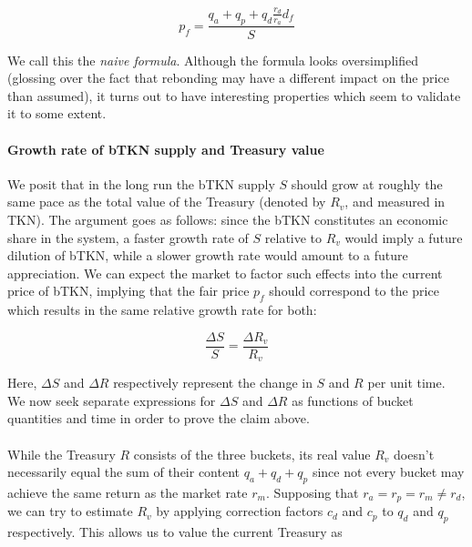\documentclass{article}
\begin{document}
\begin{equation}
  \label{eq:naive-4}
   p_f = \frac{q_a + q_p + q_d \frac{r_d}{r_a} d_f}{S}
\end{equation}

We call this the \textit{naive formula}. Although the formula looks oversimplified (glossing over the fact that rebonding may have a different impact on the price than assumed), it turns out to have interesting properties which seem to validate it to some extent.

\paragraph{Growth rate of bTKN supply and Treasury value}
We posit that in the long run the bTKN supply $S$ should grow at roughly the same pace as the total value of the Treasury (denoted by $R_v$, and measured in TKN). The argument goes as follows: since the bTKN constitutes an economic share in the system, a faster growth rate of $S$ relative to $R_v$ would imply a future dilution of bTKN, while a slower growth rate would amount to a future appreciation. We can expect the market to factor such effects into the current price of bTKN, implying that the fair price $p_f$ should correspond to the price which results in the same relative growth rate for both:

\begin{equation}
  \label{eq:same_growth_rate}
  \frac{\Delta S}{S} = \frac{\Delta R_v}{R_v}
\end{equation}


Here, $\Delta S$ and $\Delta R$ respectively represent the change in $S$ and $R$ per unit time.  We now seek separate expressions for $\Delta S$ and $\Delta R$ as functions of bucket quantities and time in order to prove the claim above.

\paragraph{}
While the Treasury $R$ consists of the three buckets, its real value $R_v$ doesn't necessarily equal the sum of their content $q_a+q_d+q_p$ since not every bucket may achieve the same return as the market rate $r_m$. Supposing that $r_a=r_p=r_m \neq r_d$, we can try to estimate $R_v$ by applying correction factors $c_d$ and $c_p$ to $q_d$ and $q_p$ respectively. This allows us to value the current Treasury as
\end{document}
